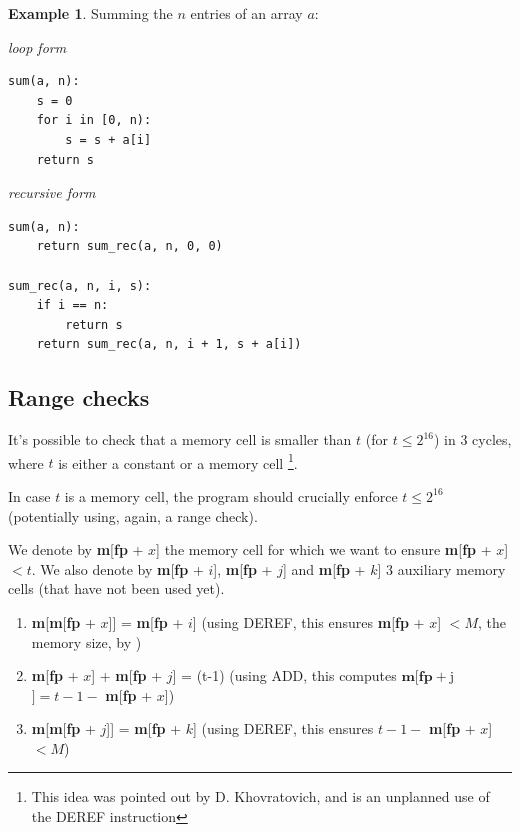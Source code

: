\documentclass{article}
\theoremstyle{definition}
\newtheorem{exmp}{Example}[section]
\begin{document}
\begin{exmp}
Summing the $n$ entries of an array $a$:

\begin{center}
\begin{minipage}[t]{0.46\textwidth}
\centering\textit{loop form}
\begin{verbatim}
sum(a, n):
    s = 0
    for i in [0, n):
        s = s + a[i]
    return s
\end{verbatim}
\end{minipage}
\hfill
\begin{minipage}[t]{0.46\textwidth}
\centering\textit{recursive form}
\begin{verbatim}
sum(a, n):
    return sum_rec(a, n, 0, 0)

sum_rec(a, n, i, s):
    if i == n:
        return s
    return sum_rec(a, n, i + 1, s + a[i])
\end{verbatim}
\end{minipage}
\end{center}

\end{exmp}

\subsection{Range checks}\label{sec:range-checks}

It's possible to check that a memory cell is smaller than $t$ (for $t \leq 2^{16}$) in 3 cycles, where $t$ is either a constant or a memory cell \footnote{This idea was pointed out by D. Khovratovich, and is an unplanned use of the DEREF instruction}.

In case $t$ is a memory cell, the program should crucially enforce $t \leq 2^{16}$ (potentially using, again, a range check).

We denote by \textbf{m}[\textbf{fp} + $x$] the memory cell for which we want to ensure \textbf{m}[\textbf{fp} + $x$] $< t$.
We also denote by \textbf{m}[\textbf{fp} + $i$], \textbf{m}[\textbf{fp} + $j$] and \textbf{m}[\textbf{fp} + $k$] 3 auxiliary memory cells (that have not been used yet).
\begin{enumerate}
    \item \textbf{m}[\textbf{m}[\textbf{fp} + $x$]] = \textbf{m}[\textbf{fp} + $i$] (using DEREF, this ensures \textbf{m}[\textbf{fp} + $x$] $ < M$, the memory size, by )
    \item \textbf{m}[\textbf{fp} + $x$] + \textbf{m}[\textbf{fp} + $j$] = (t-1) (using ADD, this computes $\textbf{m}[\textbf{fp} + $j$] = t - 1 - $ \textbf{m}[\textbf{fp} + $x$])
        \item \textbf{m}[\textbf{m}[\textbf{fp} + $j$]] = \textbf{m}[\textbf{fp} + $k$] (using DEREF, this ensures $t - 1 - $ \textbf{m}[\textbf{fp} + $x$] $ < M$)
\end{enumerate}
\end{document}
